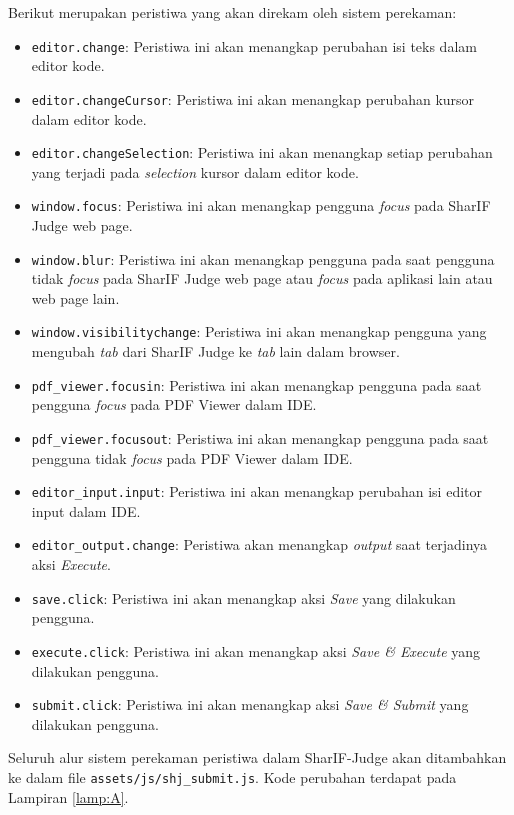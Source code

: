 Berikut merupakan peristiwa yang akan direkam oleh sistem perekaman:
\begin{itemize}
    \item \verb|editor.change|: Peristiwa ini akan menangkap perubahan isi teks dalam editor kode.
    \item \verb|editor.changeCursor|: Peristiwa ini akan menangkap perubahan kursor dalam editor kode. 
    \item \verb|editor.changeSelection|: Peristiwa ini akan menangkap setiap perubahan yang terjadi pada \textit{selection} kursor dalam editor kode.
    \item \verb|window.focus|: Peristiwa ini akan menangkap pengguna \textit{focus} pada SharIF Judge web page. 
    \item \verb|window.blur|: Peristiwa ini akan menangkap pengguna pada saat pengguna tidak \textit{focus} pada SharIF Judge web page atau \textit{focus} pada aplikasi lain atau web page lain.
    \item \verb|window.visibilitychange|: Peristiwa ini akan menangkap pengguna yang mengubah \textit{tab} dari SharIF Judge ke \textit{tab} lain dalam browser.
    \item \verb|pdf_viewer.focusin|: Peristiwa ini akan menangkap pengguna pada saat pengguna \textit{focus} pada PDF Viewer dalam IDE.
    \item \verb|pdf_viewer.focusout|: Peristiwa ini akan menangkap pengguna pada saat pengguna tidak \textit{focus} pada PDF Viewer dalam IDE.
    \item \verb|editor_input.input|: Peristiwa ini akan menangkap perubahan isi editor input dalam IDE. 
    \item \verb|editor_output.change|: Peristiwa akan menangkap \textit{output} saat terjadinya aksi \textit{Execute}.
    \item \verb|save.click|: Peristiwa ini akan menangkap aksi \textit{Save} yang dilakukan pengguna.
    \item \verb|execute.click|: Peristiwa ini akan menangkap aksi \textit{Save \& Execute} yang dilakukan pengguna.
    \item \verb|submit.click|: Peristiwa ini akan menangkap aksi \textit{Save \& Submit} yang dilakukan pengguna.
\end{itemize}

Seluruh alur sistem perekaman peristiwa dalam SharIF-Judge akan ditambahkan ke dalam file \verb|assets/js/|\verb|shj_submit.js|. Kode perubahan terdapat pada Lampiran \ref{lamp:A}.

